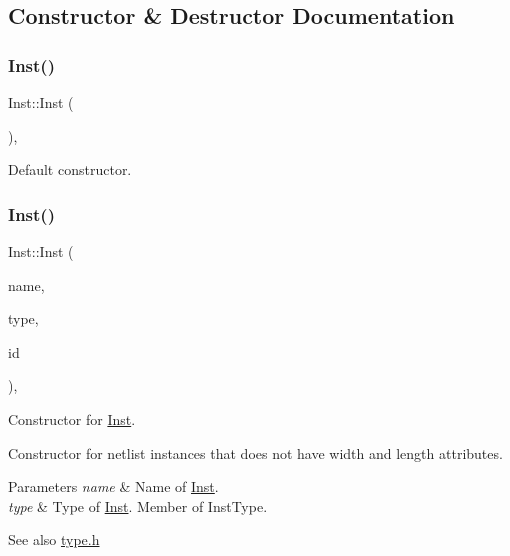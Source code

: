 \subsection{Constructor \& Destructor Documentation}
\mbox{\label{classInst_af6abd595ee04b976a8928325df4076c1}} 
\subsubsection{\texorpdfstring{Inst()}{Inst()}\hspace{0.1cm}{\footnotesize\ttfamily [1/3]}}
{\footnotesize\ttfamily Inst\+::\+Inst (\begin{DoxyParamCaption}{ }\end{DoxyParamCaption})\hspace{0.3cm}{\ttfamily [explicit]}, {\ttfamily [default]}}



Default constructor. 

\mbox{\label{classInst_a30315ac6216ae022a383d701d42e6a86}} 
\subsubsection{\texorpdfstring{Inst()}{Inst()}\hspace{0.1cm}{\footnotesize\ttfamily [2/3]}}
{\footnotesize\ttfamily Inst\+::\+Inst (\begin{DoxyParamCaption}\item[{const std\+::string \&}]{name,  }\item[{\hyperlink{type_8h_a53644c687d6bc203d9d3d3ee70075f61}{Inst\+Type}}]{type,  }\item[{\hyperlink{type_8h_a581e8093e28e7362f2b6937296190676}{Index\+Type}}]{id }\end{DoxyParamCaption})\hspace{0.3cm}{\ttfamily [inline]}, {\ttfamily [explicit]}}



Constructor for \hyperlink{classInst}{Inst}. 

Constructor for netlist instances that does not have width and length attributes.


\begin{DoxyParams}{Parameters}
{\em name} & Name of \hyperlink{classInst}{Inst}. \\
\hline
{\em type} & Type of \hyperlink{classInst}{Inst}. Member of Inst\+Type. \\
\hline
\end{DoxyParams}
\begin{DoxySeeAlso}{See also}
\hyperlink{type_8h}{type.\+h} 
\end{DoxySeeAlso}

